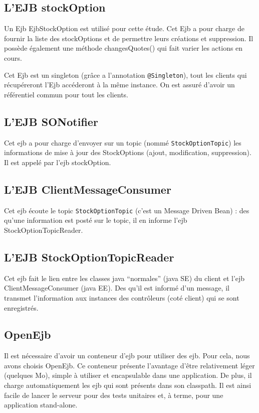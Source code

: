 \subsection{L'EJB stockOption}
Un Ejb EjbStockOption est utilisé pour cette étude. Cet Ejb a pour charge de fournir la liste des stockOptions et de permettre leurs créations et suppression. Il possède également une méthode changesQuotes() qui fait varier les actions en cours. 

Cet Ejb est un singleton (grâce a l'annotation \verb|@Singleton|), tout les clients qui récupéreront l'Ejb accéderont à la même instance. On est assuré d'avoir un référentiel commun pour tout les clients.

\subsection{L'EJB SONotifier}
Cet ejb a pour charge d'envoyer sur un topic (nommé \verb|StockOptionTopic|) les informations de mise à jour des StockOptions (ajout, modification, suppression). Il est appelé par l'ejb stockOption.

\subsection{L'EJB ClientMessageConsumer}
Cet ejb écoute le topic \verb|StockOptionTopic| (c'est un Message Driven Bean) : des qu'une information est posté sur le topic, il en informe l'ejb StockOptionTopicReader.

\subsection{L'EJB StockOptionTopicReader}
Cet ejb fait le lien entre les classes java ``normales'' (java SE) du client et l'ejb ClientMessageConsumer (java EE). Des qu'il est informé d'un message, il transmet l'information aux instances des contrôleurs (coté client) qui se sont enregistrés.

\subsection{OpenEjb}
Il est nécessaire d'avoir un conteneur d'ejb pour utiliser des ejb. Pour cela, nous avons choisis OpenEjb. Ce conteneur présente l'avantage d'être relativement léger (quelques Mo), simple à utiliser et encapsulable dans une application. De plus, il charge automatiquement les ejb qui sont présents dans son classpath. Il est ainsi facile de lancer le serveur pour des tests unitaires et, à terme, pour une application stand-alone. 



